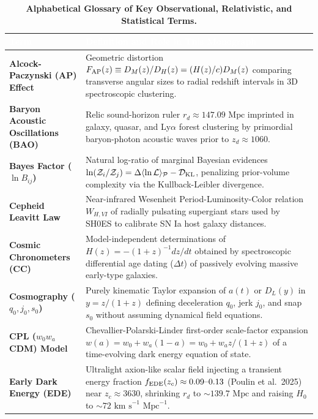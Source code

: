 \documentclass[11pt,letterpaper]{article}
\renewcommand{\arraystretch}{1.20}
\begin{document}
\begin{table}[!htbp]
\centering
\caption{\textbf{Alphabetical Glossary of Key Observational, Relativistic, and Statistical Terms.}}
\label{tab:glossary_terms}
\footnotesize
\renewcommand{\arraystretch}{1.22}
\begin{tabularx}{\textwidth}{>{\bfseries\color{primary}}p{} X}
\toprule
\rowcolor{primary} \textcolor{white}{\textbf{Term}} & \textcolor{white}{\textbf{Definition and Role in This Monograph}} \\
\midrule
Alcock-Paczynski (AP) Effect & Geometric distortion $F_{\rm AP}(z) \equiv D_M(z)/D_H(z) = (H(z)/c)D_M(z)$ comparing transverse angular sizes to radial redshift intervals in 3D spectroscopic clustering. \\
Baryon Acoustic Oscillations (BAO) & Relic sound-horizon ruler $r_d \approx 147.09\text{ Mpc}$ imprinted in galaxy, quasar, and Ly$\alpha$ forest clustering by primordial baryon-photon acoustic waves prior to $z_d \approx 1060$. \\
Bayes Factor ($\ln B_{ij}$) & Natural log-ratio of marginal Bayesian evidences $\ln(\mathcal{Z}_i/\mathcal{Z}_j) = \Delta\langle\ln\mathcal{L}\rangle_{\mathcal{P}} - \mathcal{D}_{\rm KL}$, penalizing prior-volume complexity via the Kullback-Leibler divergence. \\
Cepheid Leavitt Law & Near-infrared Wesenheit Period-Luminosity-Color relation $W_{H,VI}$ of radially pulsating supergiant stars used by SH0ES to calibrate SN Ia host galaxy distances. \\
Cosmic Chronometers (CC) & Model-independent determinations of $H(z) = -(1+z)^{-1}dz/dt$ obtained by spectroscopic differential age dating ($\Delta t$) of passively evolving massive early-type galaxies. \\
Cosmography ($q_0, j_0, s_0$) & Purely kinematic Taylor expansion of $a(t)$ or $D_L(y)$ in $y = z/(1+z)$ defining deceleration $q_0$, jerk $j_0$, and snap $s_0$ without assuming dynamical field equations. \\
CPL ($w_0 w_a$CDM) Model & Chevallier-Polarski-Linder first-order scale-factor expansion $w(a) = w_0 + w_a(1-a) = w_0 + w_a z/(1+z)$ of a time-evolving dark energy equation of state. \\
Early Dark Energy (EDE) & Ultralight axion-like scalar field injecting a transient energy fraction $f_{\rm EDE}(z_c) \approx 0.09\text{--}0.13$ (Poulin et al.\ 2025) near $z_c \approx 3630$, shrinking $r_d$ to $\sim 139.7\text{ Mpc}$ and raising $H_0$ to $\sim 72\text{ km s}^{-1}\text{ Mpc}^{-1}$. \\

\end{tabularx}
\end{table}
\end{document}

